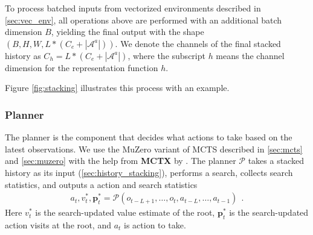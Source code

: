 To process batched inputs from vectorized environments described in \ref{sec:vec_env}, all operations above are performed with an additional batch dimension $B$, yielding the final output with the shape $(B, H, W, L * (C_e + |\mathcal{A}^a|))$.
We denote the channels of the final stacked history as $C_h = L * (C_e + |\mathcal{A}^a|)$, where the subscript $h$ means the channel dimension for the representation function $h$.

Figure \ref{fig:stacking} illustrates this process with an example.



\subsubsection{Planner} \label{sec:planner}
The planner is the component that decides what actions to take based on the latest observations.
We use the MuZero variant of MCTS described in \ref{sec:mcts} and \ref{sec:muzero} with the help from \textbf{MCTX} by \citeauthor{POLICYIMPROVEMENTPLANNING_Danihelka.Guez.ea_2022} \cite{POLICYIMPROVEMENTPLANNING_Danihelka.Guez.ea_2022}.
The planner $\mathcal{P}$ takes a stacked history as its input (\ref{sec:history_stacking}), performs a search, collects search statistics, and outputs a action and search statistics
\begin{align*}
    a_t, v^*_t, \mathbf{p}^*_t = \mathcal{P}(o_{t - L + 1}, \dots, o_t, a_{t - L}, \dots, a_{t - 1}) ~~ .
\end{align*}
Here $v^*_t$ is the search-updated value estimate of the root, $\mathbf{p}^*_t$ is the search-updated action visits at the root, and $a_t$ is action to take.

